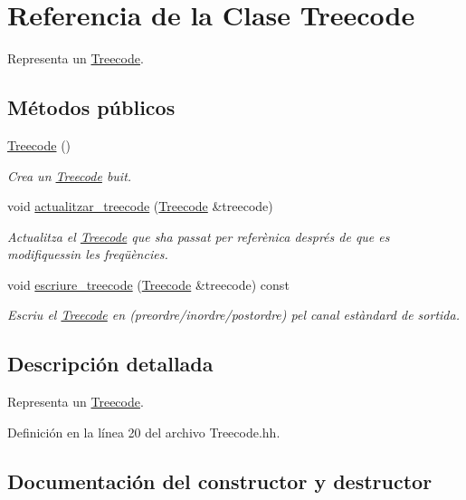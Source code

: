 \hypertarget{class_treecode}{}\section{Referencia de la Clase Treecode}
\label{class_treecode}


Representa un \hyperlink{class_treecode}{Treecode}.  


\subsection*{Métodos públicos}
\begin{DoxyCompactItemize}
\item 
\hyperlink{class_treecode_a190d6af790b7046ed7c96e7a57f0cd38}{Treecode} ()
\begin{DoxyCompactList}\small\item\em Crea un \hyperlink{class_treecode}{Treecode} buit. \end{DoxyCompactList}\item 
void \hyperlink{class_treecode_a4c82741ca239394a7aa65b701dc6856b}{actualitzar\+\_\+treecode} (\hyperlink{class_treecode}{Treecode} \&treecode)
\begin{DoxyCompactList}\small\item\em Actualitza el \hyperlink{class_treecode}{Treecode} que s\textquotesingle{}ha passat per referènica després de que es modifiquessin les freqüències. \end{DoxyCompactList}\item 
void \hyperlink{class_treecode_aab621d8e906f628565e903028fc1d90b}{escriure\+\_\+treecode} (\hyperlink{class_treecode}{Treecode} \&treecode) const
\begin{DoxyCompactList}\small\item\em Escriu el \hyperlink{class_treecode}{Treecode} en (preordre/inordre/postordre) pel canal estàndard de sortida. \end{DoxyCompactList}\end{DoxyCompactItemize}


\subsection{Descripción detallada}
Representa un \hyperlink{class_treecode}{Treecode}. 

Definición en la línea 20 del archivo Treecode.\+hh.



\subsection{Documentación del constructor y destructor}
\mbox{\label{class_treecode_a190d6af790b7046ed7c96e7a57f0cd38}} 
